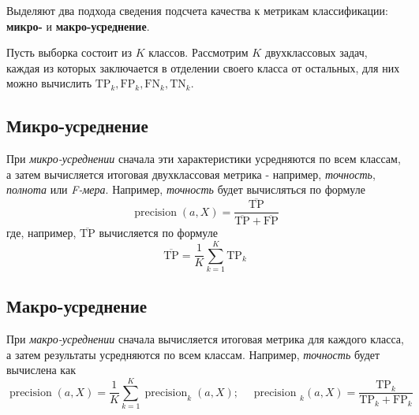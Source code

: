 Выделяют два подхода сведения подсчета качества к метрикам классификации: \textbf{микро-} и \textbf{макро-усреднение}.

Пусть выборка состоит из $K$ классов. Рассмотрим $K$ двухклассовых задач, каждая из которых заключается в отделении своего класса от остальных, для них можно вычислить $\mathrm{TP}_{k}, \mathrm{FP}_{k}, \mathrm{FN}_{k}, \mathrm{TN}_{k} .$
\subsection*{Микро-усреднение}
При \textit{микро-усреднении} сначала эти характеристики усредняются по всем классам, а затем вычисляется итоговая двухклассовая метрика - например, \textit{точность}, \textit{полнота} или \textit{F-мера}. Например, \textit{точность} будет вычисляться по формуле
$$
\operatorname{precision}(a, X)=\frac{\overline{\mathrm{TP}}}{\overline{\mathrm{TP}}+\overline{\mathrm{FP}}}
$$
где, например, $\overline{\mathrm{TP}}$ вычисляется по формуле
$$
\overline{\mathrm{TP}}=\frac{1}{K} \sum_{k=1}^{K} \mathrm{TP}_{k}
$$
\subsection*{Макро-усреднение}
При \textit{макро-усреднении} сначала вычисляется итоговая метрика для каждого класса, а затем результаты усредняются по всем классам. Например, \textit{точность} будет
вычислена как
$$
\operatorname{precision}(a, X)=\frac{1}{K} \sum_{k=1}^{K} \operatorname{precision}_{k}(a, X) ; \quad \text { precision }_{k}(a, X)=\frac{\mathrm{TP}_{k}}{\mathrm{TP}_{k}+\mathrm{FP}_{k}}
$$